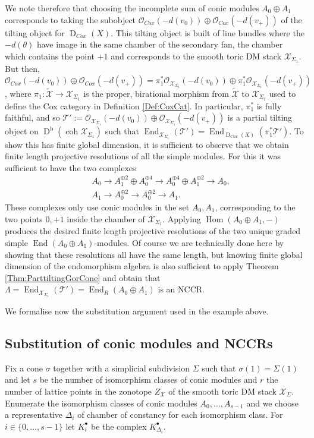 \documentclass[reqno, 12pt]{amsart}
\theoremstyle{definition}
\numberwithin{equation}{section}
\newcommand{\dbcoh}[1]{\operatorname{D}^{\operatorname{b}}(\operatorname{coh }#1)}
\newcommand{\Hom}{\operatorname{Hom}}
\def\O{\mathcal{O}}
\newcommand{\End}{\operatorname{End}}
\begin{document}
We note therefore that choosing the incomplete sum of conic modules $A_0\oplus A_1$ corresponds to taking the subobject $\O_{Cox}(-d(v_0))\oplus \O_{Cox}(-d(v_+))$ of the tilting object for $\operatorname{D}_{Cox}(X)$. This tilting object is built of line bundles where the $-d(\theta)$ have image in the same chamber of the secondary fan, the chamber which contains the point $+1$ and corresponds to the smooth toric DM stack $\mathcal{X}_{\Sigma_1}$. But then, $\O_{Cox}(-d(v_0))\oplus \O_{Cox}(-d(v_+))=\pi_1^\ast \O_{\mathcal{X}_{\Sigma_1}}(-d(v_0))\oplus\pi_1^\ast\O_{\mathcal{X}_{\Sigma_1}}(-d(v_+))$, where $\pi_1:\widetilde{\mathcal{X}}\rightarrow \mathcal{X}_{\Sigma_1}$ is the proper, birational morphism from $\widetilde{\mathcal{X}}$ to $\mathcal{X}_{\Sigma_1}$ used to define the Cox category in Definition \ref{Def:CoxCat}. In particular, $\pi_1^\ast$ is fully faithful, and so $\mathcal{T}':=\O_{\mathcal{X}_{\Sigma_1}}(-d(v_0))\oplus\O_{\mathcal{X}_{\Sigma_1}}(-d(v_+))$ is a partial tilting object on $\dbcoh{\mathcal{X}_{\Sigma_1}}$ such that $\End_{\mathcal{X}_{\Sigma_1}}(\mathcal{T}')=\End_{\operatorname{D}_{Cox}(X)}(\pi_1^\ast\mathcal{T}')$. To show this has finite global dimension, it is sufficient to observe that we obtain finite length projective resolutions of all the simple modules. For this it was sufficient to have the two complexes
\begin{eqnarray*}
        && A_0\rightarrow A_1^{\oplus 2}\oplus A_0^{\oplus 4}\rightarrow A_0^{\oplus 4}\oplus A_1^{\oplus 2}\rightarrow A_0,\\
        && A_1\rightarrow A_0^{\oplus 2}\rightarrow A_0^{\oplus 2}\rightarrow A_1.\;
    \end{eqnarray*}
These complexes only use conic modules in the set $A_0, A_1$, corresponding to the two points $0, +1$ inside the chamber of $\mathcal{X}_{\Sigma_1}$. Applying $\Hom(A_0\oplus A_1,-)$ produces the desired finite length projective resolutions of the two unique graded simple $\End(A_0\oplus A_1)$-modules. Of course we are technically done here by showing that these resolutions all have the same length, but knowing finite global dimension of the endomorphism algebra is also sufficient to apply Theorem \ref{Thm:ParttiltingGorCone} and obtain that $\Lambda=\End_{\mathcal{X}_{\Sigma_1}}(\mathcal{T}')=\End_R(A_0\oplus A_1)$ is an NCCR.

 
We formalise now the substitution argument used in the example above.

\subsection{Substitution of conic modules and NCCRs}
Fix a cone $\sigma$ together with a simplicial subdivision $\Sigma$ such that $\sigma(1)=\Sigma(1)$ and let $s$ be the number of isomorphism classes of conic modules and $r$ the number of lattice points in the zonotope $Z_\mathcal{X}$ of the smooth toric DM stack $\mathcal{X}_\Sigma$. Enumerate the isomorphism classes of conic modules $A_0,\dots,A_{s-1}$ and we choose a representative $\Delta_i$ of chamber of constancy for each isomorphism class. For $i\in\{0,\dots,s-1\}$ let $K_i^\bullet$ be the complex $K_{\Delta_i}^\bullet$.
\end{document}
